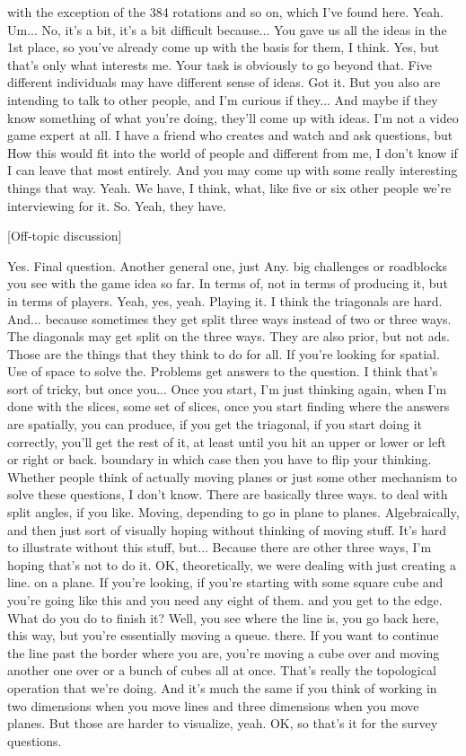 \documentclass{article}
\begin{document}
with the exception of the 384 rotations and so on, which I've found here. Yeah.
Um...
No, it's a bit, it's a bit difficult because...
You gave us all the ideas in the 1st place, so you've already come up with the basis for them, I think. Yes, but that's only what interests me. Your task is obviously to go beyond that. Five different individuals may have different sense of ideas. Got it. But you also are intending to talk to other people, and I'm curious if they...
And maybe if they know something of what you're doing, they'll come up with ideas. I'm not a video game expert at all. I have a friend who creates and watch and ask questions, but
How this would fit into the world of people and different from me, I don't know if I can leave that most entirely. And you may come up with some really interesting things that way. Yeah. We have, I think, what, like five or six other people we're interviewing for it. So. Yeah, they have.

[Off-topic discussion]

Yes. Final question. Another general one, just
Any.
big challenges or roadblocks you see with the game idea so far.
In terms of, not in terms of producing it, but in terms of players. Yeah, yes, yeah. Playing it.
I think the triagonals are hard.
And...
because sometimes they get split three ways instead of two or three ways. The diagonals may get split on the three ways. They are also prior, but not ads. Those are the things that they think to do for all. If you're looking for spatial.
Use of space to solve the.
Problems get answers to the question. I think that's sort of tricky, but once you...
Once you start, I'm just thinking again, when I'm done with the slices, some set of slices, once you start finding where the answers are spatially, you can produce, if you get the triagonal, if you start doing it correctly, you'll get the rest of it, at least until you hit an upper or lower or left or right or back.
boundary in which case then you have to flip your thinking. Whether people think of actually moving planes or just some other mechanism to solve these questions, I don't know. There are basically three ways.
to deal with split angles, if you like. Moving, depending to go in plane to planes.
Algebraically, and then just sort of visually hoping without thinking of moving stuff. It's hard to illustrate without this stuff, but...
Because there are other three ways, I'm hoping that's not to do it.
OK, theoretically, we were dealing with just creating a line.
on a plane. If you're looking, if you're starting with some square cube and you're going like this and you need any eight of them.
and you get to the edge.
What do you do to finish it? Well, you see where the line is, you go back here, this way, but you're essentially moving a queue.
there. If you want to continue the line past the border where you are, you're moving a cube over and moving another one over or a bunch of cubes all at once. That's really the topological operation that we're doing. And it's much the same if you think of working in two dimensions when you move lines and three dimensions when you move planes.
But those are harder to visualize, yeah.
OK, so that's it for the survey questions.
\end{document}
